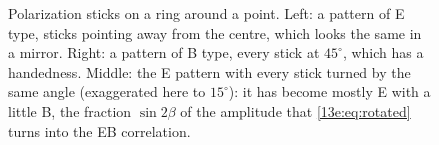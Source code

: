 \begin{figure}[htbp]
\centering
{}
\caption{Polarization sticks on a ring around a point. Left: a pattern of E type, sticks pointing away from
the centre, which looks the same in a mirror. Right: a pattern of B type, every stick at $45^\circ$, which has a
handedness. Middle: the E pattern with every stick turned by the same angle (exaggerated here to $15^\circ$):
it has become mostly E with a little B, the fraction $\sin2\beta$ of the amplitude that \eqref{13e:eq:rotated}
turns into the EB correlation.}
\label{13e:fig:sticks}
\end{figure}

